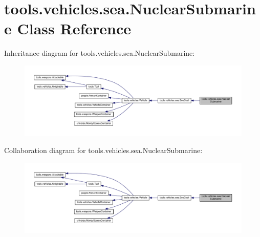 \hypertarget{classtools_1_1vehicles_1_1sea_1_1_nuclear_submarine}{}\section{tools.\+vehicles.\+sea.\+Nuclear\+Submarine Class Reference}
\label{classtools_1_1vehicles_1_1sea_1_1_nuclear_submarine}


Inheritance diagram for tools.\+vehicles.\+sea.\+Nuclear\+Submarine\+:
\nopagebreak
\begin{figure}[H]
\begin{center}
\leavevmode
\includegraphics[width=350pt]{classtools_1_1vehicles_1_1sea_1_1_nuclear_submarine__inherit__graph}
\end{center}
\end{figure}


Collaboration diagram for tools.\+vehicles.\+sea.\+Nuclear\+Submarine\+:
\nopagebreak
\begin{figure}[H]
\begin{center}
\leavevmode
\includegraphics[width=350pt]{classtools_1_1vehicles_1_1sea_1_1_nuclear_submarine__coll__graph}
\end{center}
\end{figure}
